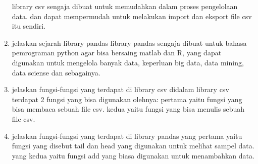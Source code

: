 \begin{enumerate}
        library csv sengaja dibuat untuk memudahkan dalam proses pengelolaan data. dan dapat mempermudah untuk melakukan import dan eksport file csv itu sendiri.
        \item jelaskan sejarah library pandas
        library pandas sengaja dibuat untuk bahasa pemrograman python agar bisa bersaing matlab dan R, yang dapat digunakan untuk mengelola banyak data, keperluan big data, data mining, data sciense dan sebagainya.
        \item jelaskan fungsi-fungsi yang terdapat di library csv
        didalam library csv terdapat 2 fungsi yang bisa digunakan olehnya:
        pertama yaitu fungsi yang bisa membaca sebuah file csv.
        kedua yaitu fungsi yang bisa menulis sebuah file csv.
        \item jelaskan fungsi-fungsi yang terdapat di library pandas
        yang pertama yaitu fungsi yang disebut tail dan head yang digunakan untuk melihat sampel data.
        yang kedua yaitu fungsi add yang biasa digunakan untuk menambahkan data.
\end{enumerate}

